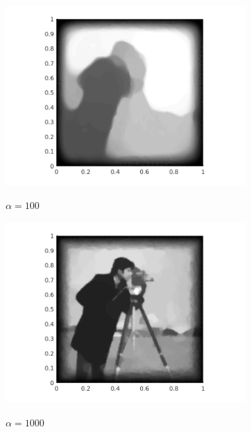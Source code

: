 \begin{figure}[!ht]
\begin{subfigure}[b]{.4\linewidth}
    \label{fig:camermanSNR10}
  \end{subfigure}

  \begin{subfigure}{.3\linewidth}
    \caption{$\alpha=100$}
    \includegraphics[trim = 60 20 60 20, clip, width=\linewidth]
      {pictures/introBeta/snr10/00100.png}
    \label{fig:snr10alpha100}
  \end{subfigure}
  \begin{subfigure}{.3\linewidth}
    \caption{$\alpha=1000$}
    \includegraphics[trim = 60 20 60 20, clip, width=\linewidth]
      {pictures/introBeta/snr10/01000.png}
    \label{fig:snr10alpha1000}
  \end{subfigure}
  \begin{subfigure}{.3\linewidth}

\end{subfigure}
\end{figure}
